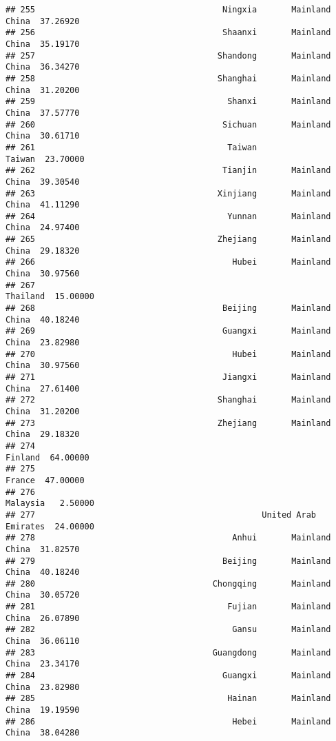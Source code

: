 \documentclass[
]{article}
\begin{document}
\begin{verbatim}
## 255                                      Ningxia       Mainland China  37.26920
## 256                                      Shaanxi       Mainland China  35.19170
## 257                                     Shandong       Mainland China  36.34270
## 258                                     Shanghai       Mainland China  31.20200
## 259                                       Shanxi       Mainland China  37.57770
## 260                                      Sichuan       Mainland China  30.61710
## 261                                       Taiwan               Taiwan  23.70000
## 262                                      Tianjin       Mainland China  39.30540
## 263                                     Xinjiang       Mainland China  41.11290
## 264                                       Yunnan       Mainland China  24.97400
## 265                                     Zhejiang       Mainland China  29.18320
## 266                                        Hubei       Mainland China  30.97560
## 267                                                          Thailand  15.00000
## 268                                      Beijing       Mainland China  40.18240
## 269                                      Guangxi       Mainland China  23.82980
## 270                                        Hubei       Mainland China  30.97560
## 271                                      Jiangxi       Mainland China  27.61400
## 272                                     Shanghai       Mainland China  31.20200
## 273                                     Zhejiang       Mainland China  29.18320
## 274                                                           Finland  64.00000
## 275                                                            France  47.00000
## 276                                                          Malaysia   2.50000
## 277                                              United Arab Emirates  24.00000
## 278                                        Anhui       Mainland China  31.82570
## 279                                      Beijing       Mainland China  40.18240
## 280                                    Chongqing       Mainland China  30.05720
## 281                                       Fujian       Mainland China  26.07890
## 282                                        Gansu       Mainland China  36.06110
## 283                                    Guangdong       Mainland China  23.34170
## 284                                      Guangxi       Mainland China  23.82980
## 285                                       Hainan       Mainland China  19.19590
## 286                                        Hebei       Mainland China  38.04280

\end{verbatim}
\end{document}

